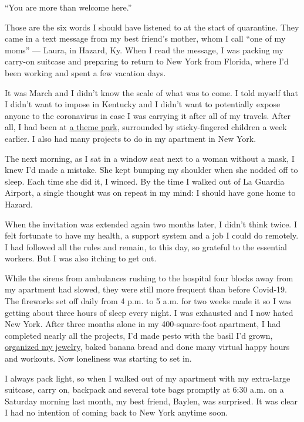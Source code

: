 ``You are more than welcome here.''

Those are the six words I should have listened to at the start of
quarantine. They came in a text message from my best friend's mother,
whom I call ``one of my moms'' --- Laura, in Hazard, Ky. When I read the
message, I was packing my carry-on suitcase and preparing to return to
New York from Florida, where I'd been working and spent a few vacation
days.

It was March and I didn't know the scale of what was to come. I told
myself that I didn't want to impose in Kentucky and I didn't want to
potentially expose anyone to the coronavirus in case I was carrying it
after all of my travels. After all, I had been at
\href{https://www.nytimes.com/2020/03/12/travel/coronavirus-disneyworld-theme-parks.html}{a
theme park}, surrounded by sticky-fingered children a week earlier. I
also had many projects to do in my apartment in New York.

The next morning, as I sat in a window seat next to a woman without a
mask, I knew I'd made a mistake. She kept bumping my shoulder when she
nodded off to sleep. Each time she did it, I winced. By the time I
walked out of La Guardia Airport, a single thought was on repeat in my
mind: I should have gone home to Hazard.

When the invitation was extended again two months later, I didn't think
twice. I felt fortunate to have my health, a support system and a job I
could do remotely. I had followed all the rules and remain, to this day,
so grateful to the essential workers. But I was also itching to get out.

While the sirens from ambulances rushing to the hospital four blocks
away from my apartment had slowed, they were still more frequent than
before Covid-19. The fireworks set off daily from 4 p.m. to 5 a.m. for
two weeks made it so I was getting about three hours of sleep every
night. I was exhausted and I now hated New York. After three months
alone in my 400-square-foot apartment, I had completed nearly all the
projects, I'd made pesto with the basil I'd grown,
\href{https://www.nytimes.com/2020/05/29/travel/the-world-in-a-jewelry-box.html}{organized
my jewelry}, baked banana bread and done many virtual happy hours and
workouts. Now loneliness was starting to set in.

I always pack light, so when I walked out of my apartment with my
extra-large suitcase, carry on, backpack and several tote bags promptly
at 6:30 a.m. on a Saturday morning last month, my best friend, Baylen,
was surprised. It was clear I had no intention of coming back to New
York anytime soon.

